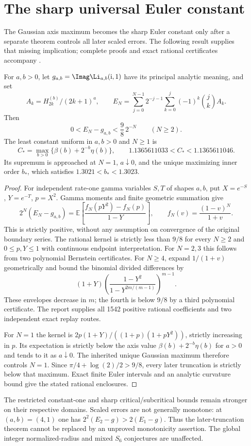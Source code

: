 \section{The sharp universal Euler constant}
\label{ue:sec:universal}
The Gaussian axis maximum becomes the sharp Euler constant only after a
separate theorem controls all later scaled errors. The following result
supplies that missing implication; complete proofs and exact rational
certificates accompany \cite{UniversalEulerReport}.

\begin{theorem}\label{ue:thm:universal}
For $a,b>0$, let $g_{a,b}=\Imag\Li_{a,b}(\mathrm i,1)$ have its principal
analytic meaning, and set
\[
 A_k=H_{2k}^{(b)}/(2k+1)^a,\qquad
 E_N=\sum_{j=0}^{N-1}2^{-j-1}\sum_{k=0}^j(-1)^k\binom jk A_k.
\]
Then
\[
 0<E_N-g_{a,b}<\frac98\,2^{-N}\qquad(N\ge2).
\]
The least constant uniform in $a,b>0$ and $N\ge1$ is
\[
 C_* = \max_{b>0}\{\beta(b)+2^{-b}\eta(b)\},\qquad
 1.1365611033<C_*<1.1365611046.
\]
Its supremum is approached at $N=1$, $a\downarrow0$, and the unique
maximizing inner order $b_*$, which satisfies $1.3021<b_*<1.3023$.
\end{theorem}
\begin{proof}
For independent rate-one gamma variables $S,T$ of shapes $a,b$, put
$X=e^{-S}$, $Y=e^{-T}$, $p=X^2$. Gamma moments and finite geometric summation give
\[
 2^N(E_N-g_{a,b})=\mathbb E\left[
 \frac{f_N(pY^2)-f_N(p)}{1-Y}\right],\qquad
 f_N(v)=\frac{(1-v)^N}{1+v}.
\]
This is strictly positive, without any assumption on convergence of the
original boundary series. The rational kernel is strictly less than
$9/8$ for every $N\ge2$ and $0\le p,Y\le1$ with continuous endpoint
interpretation. For $N=2,3$ this follows from two polynomial Bernstein
certificates. For $N\ge4$, expand $1/(1+v)$ geometrically and bound the
binomial divided differences by
\[
 (1+Y)\left(\frac{1-Y^2}{1-Y^{2m/(m-1)}}\right)^{m-1}.
\]
These envelopes decrease in $m$; the fourth is below $9/8$ by a third
polynomial certificate. The report supplies all 1542 positive rational
coefficients and two independent exact replay routes.

For $N=1$ the kernel is
$2p(1+Y)/((1+p)(1+pY^2))$, strictly increasing in $p$. Its expectation
is strictly below the axis value $\beta(b)+2^{-b}\eta(b)$ for $a>0$
and tends to it as $a\downarrow0$. The inherited unique Gaussian maximum
therefore controls $N=1$. Since $\pi/4+\log(2)/2>9/8$, every later
truncation is strictly below that maximum. Exact finite Euler intervals
and an analytic curvature bound give the stated rational enclosures.
\end{proof}

The restricted constant-one and sharp critical/subcritical bounds remain
stronger on their respective domains. Scaled errors are not generally
monotone: at $(a,b)=(4,1)$ one has
$2^2(E_2-g)>2(E_1-g)$. Thus the later-truncation theorem cannot be replaced
by an unproved monotonicity assertion. The global integer normalized-radius
and mixed $S_6$ conjectures are unaffected.
